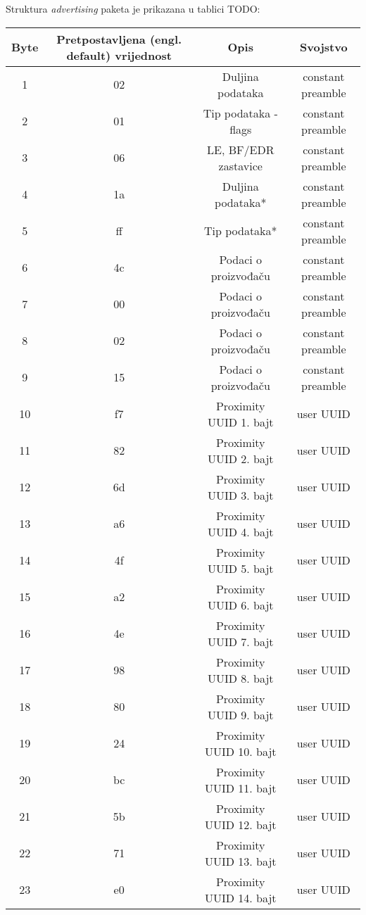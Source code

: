 Struktura \textit{advertising} paketa je prikazana u tablici TODO:
\\
\begin{table}
\begin{tabular}{|c|c|c|c|}
\hline 
Byte & Pretpostavljena (engl. default) vrijednost & Opis & Svojstvo \\ 
\hline 
1 & 02 & Duljina podataka & constant preamble \\ 
\hline 
2 & 01 & Tip podataka - flags & constant preamble \\ 
\hline 
3 & 06 & LE, BF/EDR zastavice & constant preamble \\ 
\hline 
4 & 1a & Duljina podataka* & constant preamble \\ 
\hline 
5 & ff & Tip podataka* & constant preamble \\ 
\hline 
6 & 4c & Podaci o proizvođaču & constant preamble \\ 
\hline 
7 & 00 & Podaci o proizvođaču & constant preamble \\ 
\hline 
8 & 02 & Podaci o proizvođaču & constant preamble \\ 
\hline 
9 & 15 & Podaci o proizvođaču & constant preamble \\ 
\hline 
10 & f7 & Proximity UUID 1. bajt & user UUID \\ 
\hline 
11 & 82 & Proximity UUID 2. bajt & user UUID \\ 
\hline 
12 & 6d & Proximity UUID 3. bajt & user UUID \\ 
\hline 
13 & a6 & Proximity UUID 4. bajt & user UUID \\ 
\hline 
14 & 4f & Proximity UUID 5. bajt & user UUID \\ 
\hline 
15 & a2 & Proximity UUID 6. bajt & user UUID \\ 
\hline 
16 & 4e & Proximity UUID 7. bajt & user UUID \\ 
\hline 
17 & 98 & Proximity UUID 8. bajt & user UUID \\ 
\hline 
18 & 80 & Proximity UUID 9. bajt & user UUID \\ 
\hline 
19 & 24 & Proximity UUID 10. bajt & user UUID \\ 
\hline 
20 & bc & Proximity UUID 11. bajt & user UUID \\ 
\hline 
21 & 5b & Proximity UUID 12. bajt & user UUID \\ 
\hline 
22 & 71 & Proximity UUID 13. bajt & user UUID \\ 
\hline 
23 & e0 & Proximity UUID 14. bajt & user UUID \\ 

\end{tabular}
\end{table}
